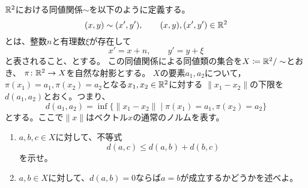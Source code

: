 \documentclass[report]{jlreq}
\begin{document}
\begin{problem}[東大数理 2006A]
    $\mathbb{R}^2$における同値関係$\sim$を以下のように定義する。
    \begin{equation}
        (x, y) \sim (x', y'),
            \qquad
            (x, y), (x', y') \in \mathbb{R}^{2}
    \end{equation}
    とは、整数$n$と有理数$\xi$が存在して
    \begin{equation}
        x' = x + n, \qquad y' = y + \xi
    \end{equation}
    と表されること、とする。
    この同値関係による同値類の集合を$X \coloneqq \mathbb{R}^2 / \sim$とおき、
    $\pi \colon \mathbb{R}^2 \to X$を自然な射影とする。
    $X$の要素$a_1, a_2$について，
    $\pi(x_1) = a_1, \pi(x_2) = a_2$となる$x_1, x_2 \in \mathbb{R}^2$に対する
    $\| x_1 - x_2 \|$の下限を$d(a_1, a_2)$とおく。つまり、
    \begin{equation}
        d(a_1, a_2) = \inf\{ \| x_1 - x_2 \| \mid \pi(x_1) = a_1, \pi(x_2) = a_2\}
    \end{equation}
    とする。ここで$\| x \|$はベクトル$x$の通常のノルムを表す。
    \begin{enumerate}
        \item $a, b, c \in X$に対して、不等式
            \begin{equation}
                d(a, c) \leq d(a, b) + d(b, c)
            \end{equation}
            を示せ。
        \item $a, b \in X$に対して、$d(a,b) = 0$ならば$a = b$が成立するかどうかを述べよ。
    \end{enumerate}
\end{problem}
\end{document}
